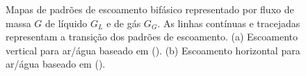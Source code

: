 \begin{figure}[ht!]
	\hspace{0.2cm}
	\caption[Mapas de padrões de escoamento bifásico.]{Mapas de padrões
	de escoamento bifásico representado por fluxo de massa $G$ de
	líquido $G_L$ e de gás $G_G$. As linhas contínuas e tracejadas
	representam a transição dos padrões de escoamento. (a) Escoamento
	vertical para ar/água baseado em (\cite{hewitt1969}). (b) Escoamento
	horizontal para ar/água baseado em (\cite{baker1954}).}
	\label{fig:map} 
\end{figure}





